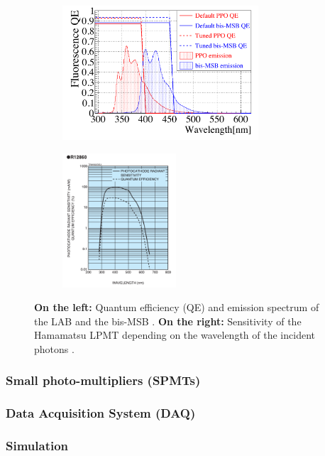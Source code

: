 \begin{figure}[ht]
  \centering
  \begin{subfigure}[b]{0.48\textwidth}
    \centering
    \includegraphics[height=5cm]{images/juno/LS_spectrum.png}
  \end{subfigure}
  \hfill
  \begin{subfigure}[b]{0.48\textwidth}
    \centering
    \includegraphics[height=5cm]{images/juno/LPMT_efficiency.png}
  \end{subfigure}
  \caption{\textbf{On the left:} Quantum efficiency (QE) and emission spectrum of the LAB and the bis-MSB \cite{bay_optimization_2020}. \textbf{On the right:} Sensitivity of the Hamamatsu LPMT depending on the wavelength of the incident photons \cite{noauthor_photomultiplier_nodate}.}
  \label{fig:LS_spectrum_and_PMT_sensitivity}
\end{figure}

\subsubsection{Small photo-multipliers (SPMTs)}
\label{sec:SPMT}

\subsubsection{Data Acquisition System (DAQ)}

\subsubsection{Simulation}

